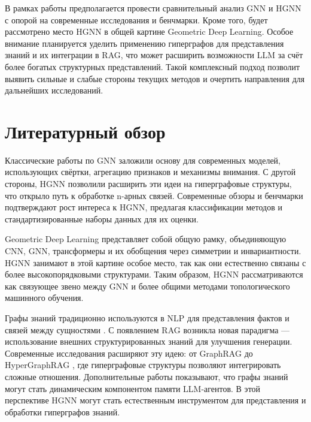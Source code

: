 \documentclass{article}
\begin{document}
В рамках работы предполагается провести сравнительный анализ GNN и HGNN с опорой на современные исследования и бенчмарки. Кроме того, будет рассмотрено место HGNN в общей картине Geometric Deep Learning. Особое внимание планируется уделить применению гиперграфов для представления знаний и их интеграции в RAG, что может расширить возможности LLM за счёт более богатых структурных представлений. Такой комплексный подход позволит выявить сильные и слабые стороны текущих методов и очертить направления для дальнейших исследований.

\section{Литературный обзор}

Классические работы по GNN \citep{kipf2017gnn,hamilton2017sage,velickovic2018gat} заложили основу для современных моделей, использующих свёртки, агрегацию признаков и механизмы внимания. С другой стороны, HGNN \citep{feng2019hgnn} позволили расширить эти идеи на гиперграфовые структуры, что открыло путь к обработке n-арных связей. Современные обзоры \citep{yang2025survey} и бенчмарки \citep{li2025benchmarks} подтверждают рост интереса к HGNN, предлагая классификации методов и стандартизированные наборы данных для их оценки.

Geometric Deep Learning \citep{bronstein2021gdl} представляет собой общую рамку, объединяющую CNN, GNN, трансформеры и их обобщения через симметрии и инвариантности. HGNN занимают в этой картине особое место, так как они естественно связаны с более высокопорядковыми структурами. Таким образом, HGNN рассматриваются как связующее звено между GNN и более общими методами топологического машинного обучения.

Графы знаний традиционно используются в NLP для представления фактов и связей между сущностями \citep{hogan2021kg}. С появлением RAG \citep{lewis2020rag} возникла новая парадигма — использование внешних структурированных знаний для улучшения генерации. Современные исследования расширяют эту идею: от GraphRAG \citep{han2025graphrag} до HyperGraphRAG \citep{luo2025hypergraphrag}, где гиперграфовые структуры позволяют интегрировать сложные отношения. Дополнительные работы \citep{wu2024memory,rasmussen2025dynamic,anokhin2024agents} показывают, что графы знаний могут стать динамическим компонентом памяти LLM-агентов. В этой перспективе HGNN могут стать естественным инструментом для представления и обработки гиперграфов знаний.



\end{document}
